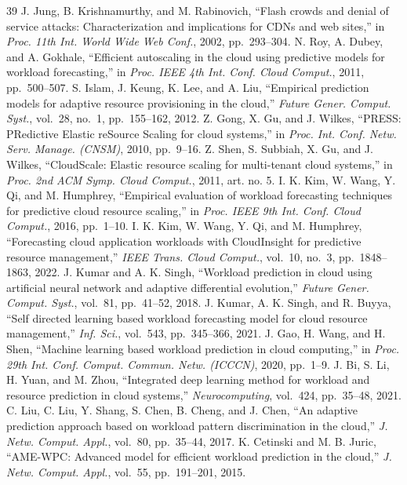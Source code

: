 \documentclass[journal,onecolumn,11pt]{IEEEtran}
\begin{document}
\begin{thebibliography}{39}
 J. Jung, B. Krishnamurthy, and M. Rabinovich, ``Flash crowds and denial of service attacks: Characterization and implications for CDNs and web sites,'' in \emph{Proc. 11th Int. World Wide Web Conf.}, 2002, pp.~293--304.
 N. Roy, A. Dubey, and A. Gokhale, ``Efficient autoscaling in the cloud using predictive models for workload forecasting,'' in \emph{Proc. IEEE 4th Int. Conf. Cloud Comput.}, 2011, pp.~500--507.
 S. Islam, J. Keung, K. Lee, and A. Liu, ``Empirical prediction models for adaptive resource provisioning in the cloud,'' \emph{Future Gener. Comput. Syst.}, vol.~28, no.~1, pp.~155--162, 2012.
 Z. Gong, X. Gu, and J. Wilkes, ``PRESS: PRedictive Elastic reSource Scaling for cloud systems,'' in \emph{Proc. Int. Conf. Netw. Serv. Manage. (CNSM)}, 2010, pp.~9--16.
 Z. Shen, S. Subbiah, X. Gu, and J. Wilkes, ``CloudScale: Elastic resource scaling for multi-tenant cloud systems,'' in \emph{Proc. 2nd ACM Symp. Cloud Comput.}, 2011, art. no. 5.
 I. K. Kim, W. Wang, Y. Qi, and M. Humphrey, ``Empirical evaluation of workload forecasting techniques for predictive cloud resource scaling,'' in \emph{Proc. IEEE 9th Int. Conf. Cloud Comput.}, 2016, pp.~1--10.
 I. K. Kim, W. Wang, Y. Qi, and M. Humphrey, ``Forecasting cloud application workloads with CloudInsight for predictive resource management,'' \emph{IEEE Trans. Cloud Comput.}, vol.~10, no.~3, pp.~1848--1863, 2022.
 J. Kumar and A. K. Singh, ``Workload prediction in cloud using artificial neural network and adaptive differential evolution,'' \emph{Future Gener. Comput. Syst.}, vol.~81, pp.~41--52, 2018.
 J. Kumar, A. K. Singh, and R. Buyya, ``Self directed learning based workload forecasting model for cloud resource management,'' \emph{Inf. Sci.}, vol.~543, pp.~345--366, 2021.
 J. Gao, H. Wang, and H. Shen, ``Machine learning based workload prediction in cloud computing,'' in \emph{Proc. 29th Int. Conf. Comput. Commun. Netw. (ICCCN)}, 2020, pp.~1--9.
 J. Bi, S. Li, H. Yuan, and M. Zhou, ``Integrated deep learning method for workload and resource prediction in cloud systems,'' \emph{Neurocomputing}, vol.~424, pp.~35--48, 2021.
 C. Liu, C. Liu, Y. Shang, S. Chen, B. Cheng, and J. Chen, ``An adaptive prediction approach based on workload pattern discrimination in the cloud,'' \emph{J. Netw. Comput. Appl.}, vol.~80, pp.~35--44, 2017.
 K. Cetinski and M. B. Juric, ``AME-WPC: Advanced model for efficient workload prediction in the cloud,'' \emph{J. Netw. Comput. Appl.}, vol.~55, pp.~191--201, 2015.

\end{thebibliography}
\end{document}
